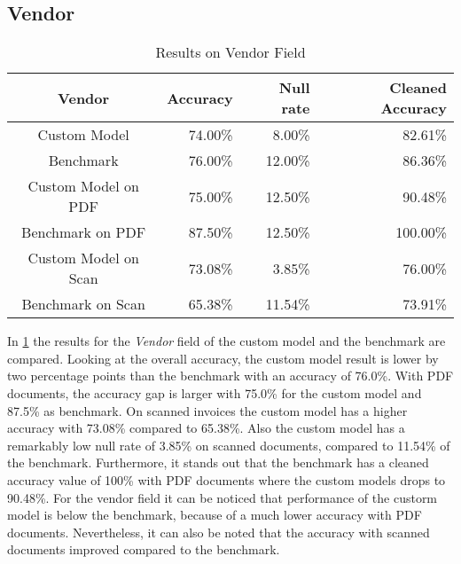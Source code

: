 \subsection*{Vendor}
\begin{table}[ht]   %
    \centering
    \footnotesize
    \begin{tabular}{c|rrr} %
        \toprule    %
        Vendor  & Accuracy  & Null rate & Cleaned Accuracy \\
        \midrule    %
        Custom Model               & 74.00\%   & 8.00\%   & 82.61\% \\
        Benchmark           & 76.00\%   & 12.00\%  & 86.36\%\\
        \midrule    %
        Custom Model on PDF        & 75.00\%   & 12.50\%  & 90.48\% \\
        Benchmark on PDF    & 87.50\%   & 12.50\%  & 100.00\% \\
        \midrule    %
        Custom Model on Scan       & 73.08\%  & 3.85\%   & 76.00\% \\
        Benchmark on Scan   & 65.38\%  & 11.54\%  & 73.91\% \\

        \bottomrule %
    \end{tabular}
    \caption{Results on Vendor Field}
    \label{table:Model_Bench_Vendor}
\end{table}

In \cref{table:Model_Bench_Vendor} the results for the \textit{Vendor} field of the custom model and the benchmark are compared. 
Looking at the overall accuracy, the custom model result is lower by two percentage points than the benchmark with an accuracy of 76.0\%. 
With PDF documents, the accuracy gap is larger with 75.0\% for the custom model and 87.5\% as benchmark. 
On scanned invoices the custom model has a higher accuracy with 73.08\% compared to 65.38\%. 
Also the custom model has a remarkably low null rate of 3.85\% on scanned documents, compared to 11.54\% of the benchmark.
Furthermore, it stands out that the benchmark has a cleaned accuracy value of 100\% with PDF documents where the custom models drops to 90.48\%.
For the vendor field it can be noticed that performance of the custorm model is below the benchmark, because of a much lower accuracy with PDF documents.
Nevertheless, it can also be noted that the accuracy with scanned documents improved compared to the benchmark.

